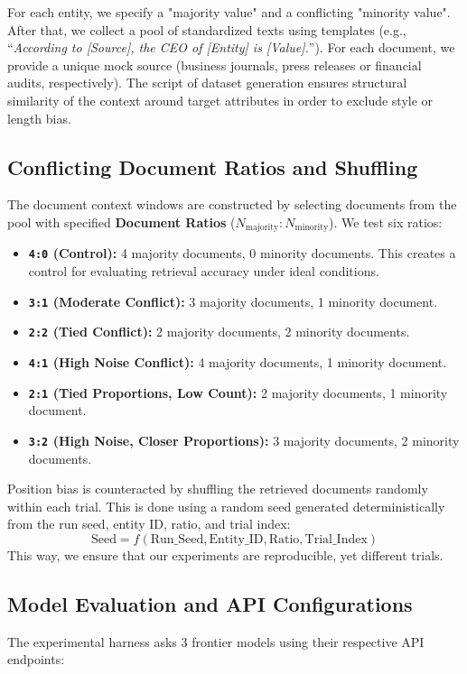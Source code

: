 \documentclass{article}
\begin{document}
For each entity, we specify a "majority value" and a conflicting "minority value". After that, we collect a pool of standardized texts using templates (e.g., ``\textit{According to [Source], the CEO of [Entity] is [Value].}''). For each document, we provide a unique mock source (business journals, press releases or financial audits, respectively). The script of dataset generation ensures structural similarity of the context around target attributes in order to exclude style or length bias.

\subsection{Conflicting Document Ratios and Shuffling}
The document context windows are constructed by selecting documents from the pool with specified \textbf{Document Ratios} ($N_{\text{majority}} : N_{\text{minority}}$). We test six ratios:
\begin{itemize}
    \item \textbf{\texttt{4:0} (Control):} 4 majority documents, 0 minority documents. This creates a control for evaluating retrieval accuracy under ideal conditions.
    \item \textbf{\texttt{3:1} (Moderate Conflict):} 3 majority documents, 1 minority document.
    \item \textbf{\texttt{2:2} (Tied Conflict):} 2 majority documents, 2 minority documents.
    \item \textbf{\texttt{4:1} (High Noise Conflict):} 4 majority documents, 1 minority document.
    \item \textbf{\texttt{2:1} (Tied Proportions, Low Count):} 2 majority documents, 1 minority document.
    \item \textbf{\texttt{3:2} (High Noise, Closer Proportions):} 3 majority documents, 2 minority documents.
\end{itemize}

Position bias is counteracted by shuffling the retrieved documents randomly within each trial. This is done using a random seed generated deterministically from the run seed, entity ID, ratio, and trial index:
\begin{equation}
\text{Seed} = f(\text{Run\_Seed}, \text{Entity\_ID}, \text{Ratio}, \text{Trial\_Index})
\end{equation}
This way, we ensure that our experiments are reproducible, yet different trials.

\subsection{Model Evaluation and API Configurations}
The experimental harness asks 3 frontier models using their respective API endpoints:
\end{document}
